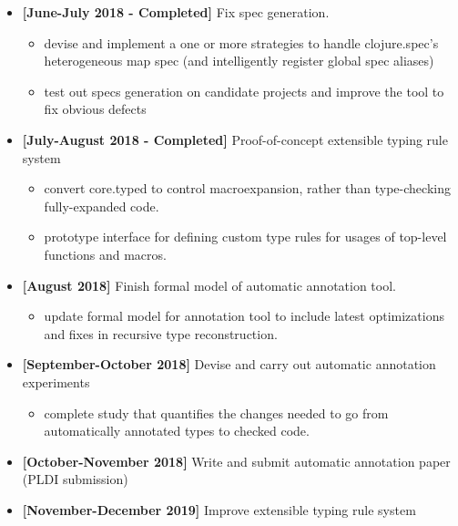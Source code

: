\documentclass[9pt]{extarticle}
\begin{document}
\begin{itemize}
  \item \textbf{[June-July 2018 - Completed]} Fix spec generation.
    \begin{itemize}
      \item devise and implement a one or more strategies to handle clojure.spec's
        heterogeneous map spec (and intelligently register global spec aliases)
      \item test out specs generation on candidate projects and improve the tool to fix obvious
        defects
    \end{itemize}
  \item \textbf{[July-August 2018 - Completed]} Proof-of-concept extensible typing rule system
    \begin{itemize}
      \item convert core.typed to control macroexpansion, rather than type-checking
        fully-expanded code.
      \item prototype interface for defining custom type rules for usages of top-level functions and macros.
    \end{itemize}
  \item \textbf{[August 2018]} Finish formal model of automatic annotation tool.
    \begin{itemize}
      \item update formal model for annotation tool to include latest
        optimizations and fixes in recursive type reconstruction.
    \end{itemize}
  \item \textbf{[September-October 2018]} Devise and carry out automatic annotation experiments
    \begin{itemize}
      \item complete study that quantifies the changes needed to go from automatically annotated types
        to checked code.
    \end{itemize}
  \item \textbf{[October-November 2018]} Write and submit automatic annotation paper (PLDI submission)
  \item \textbf{[November-December 2019]} Improve extensible typing rule system

\end{itemize}
\end{document}
